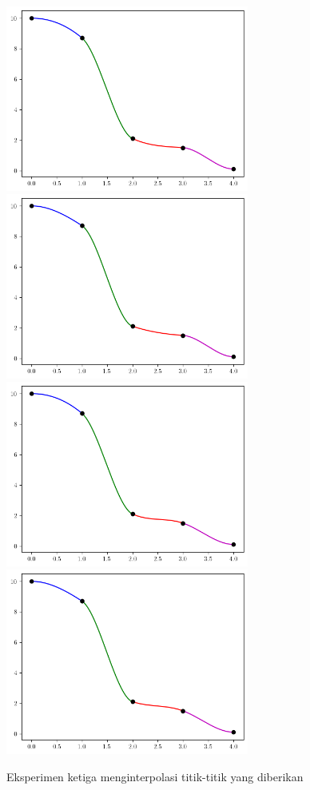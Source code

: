 \begin{figure}[H]
    \centering
    \includegraphics[width=8cm]{Images/figure_2/grafikOFB3.png}
    \\
    \includegraphics[width=8cm]{Images/figure_2/grafikOAY3.png}
    \\
    \includegraphics[width=8cm]{Images/figure_2/grafikRFB3.png}
    \\
    \includegraphics[width=8cm]{Images/figure_2/grafikRAY3.png}
    \caption{Eksperimen ketiga menginterpolasi titik-titik yang diberikan}
    \label{grafikPlot3}
\end{figure}

